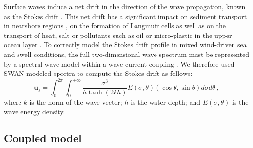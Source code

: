 \documentclass[preprint,12pt,authoryear]{elsarticle}
\begin{document}
Surface waves induce a net drift in the direction of the wave propagation, known as the Stokes drift \citep{van2018stokes,stokes1880theory}. This net drift has a significant impact on sediment transport in nearshore regions \citep{hoefel2003wave}, on the formation of Langmuir cells \citep{langmuir1938surface, craik1976rational} as well as on the transport of heat, salt or pollutants such as oil or micro-plastic in the upper ocean layer \citep{mcwilliams2000vertical,rohrs2012observation,drivdal2014wave}. To correctly model the Stokes drift profile in mixed wind-driven sea and swell conditions, the full two-dimensional wave spectrum must be represented by a spectral wave model within a wave-current coupling \citep{van2018stokes}. We therefore used SWAN modeled spectra to compute the Stokes drift as follows:
\begin{equation}
    \mathbf{u}_{s} = \int_0^{2\pi}\int_0^{+\infty} \dfrac{\sigma^3}{h\tanh(2kh)}E(\sigma,\theta)(\cos\theta, \sin\theta)d\sigma d\theta~, \label{eq:stokes}
\end{equation}
where $k$ is the norm of the wave vector; $h$ is the water depth; and $E(\sigma,\theta)$ is the wave energy density.

\subsection{Coupled model}
\end{document}
